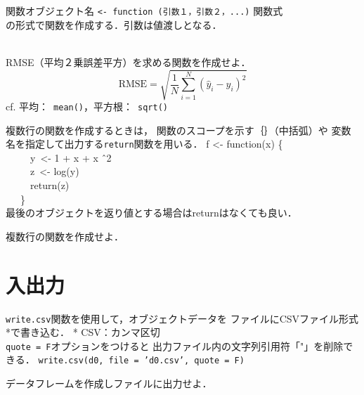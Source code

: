 {
  {
    関数オブジェクト名 \texttt{<- function (引数１，引数２，...)} 関数式\\
    の形式で関数を作成する．引数は値渡しとなる．
  }
  \MyConsole
  {
    \\
    \\
  }
}

{
  \MyExercise
  {
    RMSE（平均２乗誤差平方）を求める関数を作成せよ．
    \vspace{-2mm}
    \[
      \mathrm{RMSE}=\sqrt{\frac{1}{N}\sum_{i=1}^{N}(\hat{y}_i-y_i)^2}
    \]
    cf. 平均：~\texttt{mean()}，平方根：~\texttt{sqrt()}
  }
}

{
  {
    複数行の関数を作成するときは，
    関数のスコープを示す｛｝（中括弧）や
    変数名を指定して出力する\texttt{return}関数を用いる．
  }
  \MyCols
  {
    \MyConsole
    {
      \MyCmd
      {
        f <- function(x) \{\\
          ~~~~~y~<- 1 + x + x \^ \ 2\\
          ~~~~~z~<- log(y)\\
          ~~~~~return(z)\\
          ~~~\}
      }
    }
  }
  {
    \MyConsole
    {
      \\
    }
  }
  最後のオブジェクトを返り値とする場合はreturnはなくても良い．
}

\MyFrame{\insertsection~}
{
  \MyExercise
  {
    複数行の関数を作成せよ．
  }
}

\section{入出力}

{
  {
    \texttt{write.csv}関数を使用して，オブジェクトデータを
    ファイルにCSVファイル形式*で書き込む．
    * CSV：カンマ区切
  }
  \MyConsole
  {
    \\
  }
  \texttt{quote = F}オプションをつけると
  出力ファイル内の文字列引用符「"」を削除できる．
  \texttt{write.csv(d0, file = 'd0.csv', quote = F)}
}

{
  \MyExercise
  {
    データフレームを作成しファイルに出力せよ．
  }
}

